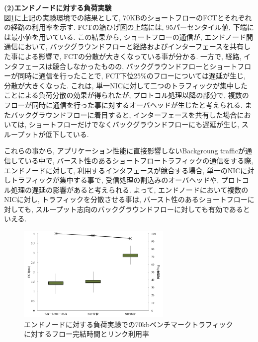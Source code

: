\documentclass[11pt, a4paper, twocolumn]{jsarticle}
\begin{document}
{\bf (2)エンドノードに対する負荷実験}\\
図\ref{fig:real_exp0}に上記の実験環境での結果として,
70KBのショートフローのFCTとそれぞれの経路の利用率を示す.
FCTの箱ひげ図の上端には, 95パーセンタイル値, 下端には最小値を用いている.
この結果から, ショートフローの通信が, エンドノード間通信において, バックグラウンドフローと経路およびインターフェースを共有した事による影響で,
FCTの分散が大きくなっている事が分かる.
一方で, 経路, インタフェースは競合しなかったものの, バックグラウンドフローとショートフローが同時に通信を行ったことで,
FCT下位25\%のフローについては遅延が生じ, 分散が大きくなった.
これは, 単一NICに対して二つのトラフィックが集中したことによる負荷分散の効果が得られたが, プロトコル処理以降の部分で,
複数のフローが同時に通信を行った事に対するオーバヘッドが生じたと考えられる.
またバックグラウンドフローに着目すると, インターフェースを共有した場合においては,
ショートフローだけでなくバックグラウンドフローにも遅延が生じ, スループットが低下している.

これらの事から, アプリケーション性能に直接影響しないBackgroung trafficが通信している中で,
バースト性のあるショートフロートラフィックの通信をする際, エンドノードに対して, 利用するインタフェースが競合する場合,
単一のNICに対しトラフィックが集中する事で, 受信処理の割込みのオーバヘッドや, プロトコル処理の遅延の影響があると考えられる.
よって, エンドノードにおいて複数のNICに対し, トラフィックを分散させる事は, バースト性のあるショートフローに対しても,
スループット志向のバックグラウンドフローに対しても有効であるといえる.

\begin{figure}[h]
    \begin{center}
    \includegraphics[autoebb, width=210pt]{./img/real_eth0.pdf}
    \caption{エンドノードに対する負荷実験での70kbベンチマークトラフィックに対するフロー完結時間とリンク利用率}
    \label{fig:real_exp0}
    \end{center}
\end{figure}
\end{document}
